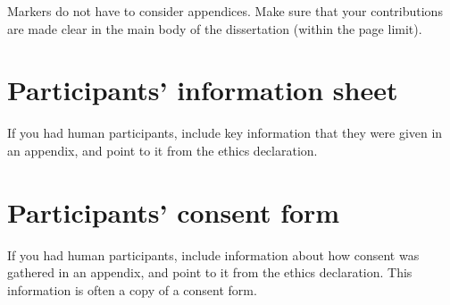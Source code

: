 \documentclass[logo,bsc,singlespacing,parskip]{infthesis}
\begin{document}
Markers do not have to consider appendices. Make sure that your contributions
are made clear in the main body of the dissertation (within the page limit).

\chapter{Participants' information sheet}

If you had human participants, include key information that they were given in
an appendix, and point to it from the ethics declaration.

\chapter{Participants' consent form}

If you had human participants, include information about how consent was
gathered in an appendix, and point to it from the ethics declaration.
This information is often a copy of a consent form.
\end{document}
